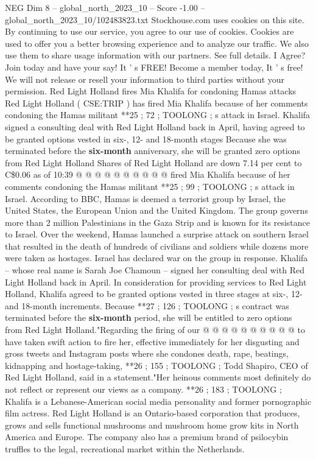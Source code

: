 \begin{textsample}{NEG Dim 8 – global\_north\_2023\_10 – Score -1.00 – global\_north\_2023\_10/102483823.txt}  \label{ex:f8_neg_243}
Stockhouse.com uses cookies on this site.
By continuing to use our service, you agree to our use of cookies.
Cookies are used to offer you a better browsing experience and to analyze our traffic.
We also use them to share usage information with our partners.
See full details.
I Agree?
Join today and have your say!
It ' s FREE!
Become a member today, It ' s free!
We will not release or resell your information to third parties without your permission.
Red Light Holland fires Mia Khalifa for condoning Hamas attacks Red Light Holland ( CSE:TRIP ) has fired Mia Khalifa because of her comments condoning the Hamas militant **25 ; 72 ; TOOLONG ; s attack in Israel.
Khalifa signed a consulting deal with Red Light Holland back in April, having agreed to be granted options vested in six-, 12- and 18-month stages Because she was terminated before the \textbf{six-month} anniversary, she will be granted zero options from Red Light Holland Shares of Red Light Holland are down 7.14 per cent to C\$0.06 as of 10:39 @ @ @ @ @ @ @ @ @ @ fired Mia Khalifa because of her comments condoning the Hamas militant **25 ; 99 ; TOOLONG ; s attack in Israel.
According to BBC, Hamas is deemed a terrorist group by Israel, the United States, the European Union and the United Kingdom.
The group governs more than 2 million Palestinians in the Gaza Strip and is known for its resistance to Israel.
Over the weekend, Hamas launched a surprise attack on southern Israel that resulted in the death of hundreds of civilians and soldiers while dozens more were taken as hostages.
Israel has declared war on the group in response.
Khalifa -- whose real name is Sarah Joe Chamoun -- signed her consulting deal with Red Light Holland back in April.
In consideration for providing services to Red Light Holland, Khalifa agreed to be granted options vested in three stages at six-, 12- and 18-month increments.
Because **27 ; 126 ; TOOLONG ; s contract was terminated before the \textbf{six-month} period, she will be entitled to zero options from Red Light Holland."Regarding the firing of our @ @ @ @ @ @ @ @ @ @ to have taken swift action to fire her, effective immediately for her disgusting and gross tweets and Instagram posts where she condones death, rape, beatings, kidnapping and hostage-taking, **26 ; 155 ; TOOLONG ; Todd Shapiro, CEO of Red Light Holland, said in a statement."Her heinous comments most definitely do not reflect or represent our views as a company. **26 ; 183 ; TOOLONG ; Khalifa is a Lebanese-American social media personality and former pornographic film actress.
Red Light Holland is an Ontario-based corporation that produces, grows and sells functional mushrooms and mushroom home grow kits in North America and Europe.
The company also has a premium brand of psilocybin truffles to the legal, recreational market within the Netherlands.

\end{textsample}
